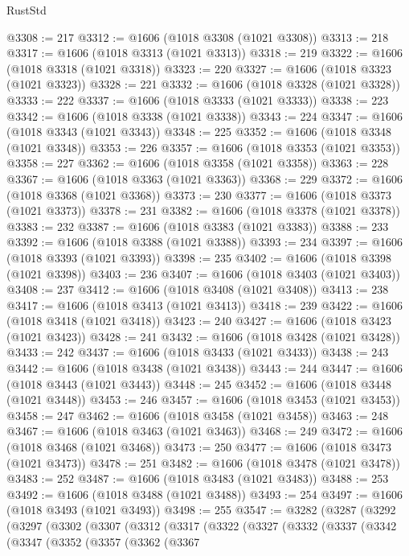 \begin{lexlean}{RustStd}
\begin{coremodule}
{\begin{coremodule}
{{{{{{{{{{{{{{{{{{{{{{{{{{{{{{{{{{{{{{{{{{{{{{{{{{{{{{{{{{{{{{{{{{{{@3308 := 217
@3312 := @1606 (@1018 @3308 (@1021 @3308))
@3313 := 218
@3317 := @1606 (@1018 @3313 (@1021 @3313))
@3318 := 219
@3322 := @1606 (@1018 @3318 (@1021 @3318))
@3323 := 220
@3327 := @1606 (@1018 @3323 (@1021 @3323))
@3328 := 221
@3332 := @1606 (@1018 @3328 (@1021 @3328))
@3333 := 222
@3337 := @1606 (@1018 @3333 (@1021 @3333))
@3338 := 223
@3342 := @1606 (@1018 @3338 (@1021 @3338))
@3343 := 224
@3347 := @1606 (@1018 @3343 (@1021 @3343))
@3348 := 225
@3352 := @1606 (@1018 @3348 (@1021 @3348))
@3353 := 226
@3357 := @1606 (@1018 @3353 (@1021 @3353))
@3358 := 227
@3362 := @1606 (@1018 @3358 (@1021 @3358))
@3363 := 228
@3367 := @1606 (@1018 @3363 (@1021 @3363))
@3368 := 229
@3372 := @1606 (@1018 @3368 (@1021 @3368))
@3373 := 230
@3377 := @1606 (@1018 @3373 (@1021 @3373))
@3378 := 231
@3382 := @1606 (@1018 @3378 (@1021 @3378))
@3383 := 232
@3387 := @1606 (@1018 @3383 (@1021 @3383))
@3388 := 233
@3392 := @1606 (@1018 @3388 (@1021 @3388))
@3393 := 234
@3397 := @1606 (@1018 @3393 (@1021 @3393))
@3398 := 235
@3402 := @1606 (@1018 @3398 (@1021 @3398))
@3403 := 236
@3407 := @1606 (@1018 @3403 (@1021 @3403))
@3408 := 237
@3412 := @1606 (@1018 @3408 (@1021 @3408))
@3413 := 238
@3417 := @1606 (@1018 @3413 (@1021 @3413))
@3418 := 239
@3422 := @1606 (@1018 @3418 (@1021 @3418))
@3423 := 240
@3427 := @1606 (@1018 @3423 (@1021 @3423))
@3428 := 241
@3432 := @1606 (@1018 @3428 (@1021 @3428))
@3433 := 242
@3437 := @1606 (@1018 @3433 (@1021 @3433))
@3438 := 243
@3442 := @1606 (@1018 @3438 (@1021 @3438))
@3443 := 244
@3447 := @1606 (@1018 @3443 (@1021 @3443))
@3448 := 245
@3452 := @1606 (@1018 @3448 (@1021 @3448))
@3453 := 246
@3457 := @1606 (@1018 @3453 (@1021 @3453))
@3458 := 247
@3462 := @1606 (@1018 @3458 (@1021 @3458))
@3463 := 248
@3467 := @1606 (@1018 @3463 (@1021 @3463))
@3468 := 249
@3472 := @1606 (@1018 @3468 (@1021 @3468))
@3473 := 250
@3477 := @1606 (@1018 @3473 (@1021 @3473))
@3478 := 251
@3482 := @1606 (@1018 @3478 (@1021 @3478))
@3483 := 252
@3487 := @1606 (@1018 @3483 (@1021 @3483))
@3488 := 253
@3492 := @1606 (@1018 @3488 (@1021 @3488))
@3493 := 254
@3497 := @1606 (@1018 @3493 (@1021 @3493))
@3498 := 255
@3547 := @3282
    (@3287
      (@3292
        (@3297
          (@3302
            (@3307
              (@3312
                (@3317
                  (@3322
                    (@3327
                      (@3332
                        (@3337
                          (@3342
                            (@3347
                              (@3352
                                (@3357
                                  (@3362
                                    (@3367
}}}}}}}}}}}}}}}}}}}}}}}}}}}}}}}}}}}}}}}}}}}}}}}}}}}}}}}}}}}}}}}}}}}}
\end{coremodule}}
\end{coremodule}
\end{lexlean}
